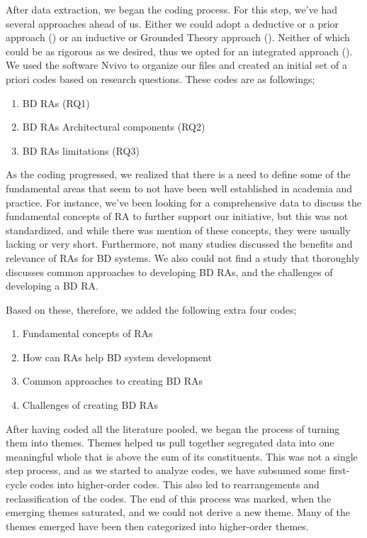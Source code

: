 \documentclass{ieeeaccess}
\begin{document}
After data extraction, we began the coding process. For this step, we've had several approaches ahead of us. Either we could adopt a deductive or a prior approach (\cite{miles1994qualitative}) or an inductive or Grounded Theory approach (\cite{corbin2014basics}). Neither of which could be as rigorous as we desired, thus we opted for an integrated approach (\cite{lofland1971analyzing}). We used the software Nvivo to organize our files and created an initial set of a priori codes based on research questions. These codes are as followings;

\begin{enumerate}
    \item BD RAs (RQ1)
    \item BD RAs Architectural components (RQ2)
    \item BD RAs limitations (RQ3)
\end{enumerate}

As the coding progressed, we realized that there is a need to define some of the fundamental areas that seem to not have been well established in academia and practice. For instance, we've been looking for a comprehensive data to discuss the fundamental concepts of RA to further support our initiative, but this was not standardized, and while there was mention of these concepts, they were usually lacking or very short. Furthermore, not many studies discussed the benefits and relevance of RAs for BD systems. We also could not find a study that thoroughly discusses common approaches to developing BD RAs, and the challenges of developing a BD RA.

Based on these, therefore, we added the following extra four codes;
\begin{enumerate}
    \item Fundamental concepts of RAs
    \item How can RAs help BD system development
    \item Common approaches to creating BD RAs
    \item Challenges of creating BD RAs
\end{enumerate}

After having coded all the literature pooled, we began the process of turning them into themes. Themes helped us pull together segregated data into one meaningful whole that is above the sum of its constituents. This was not a single step process, and as we started to analyze codes, we have subsumed some first-cycle codes into higher-order codes. This also led to rearrangements and reclassification of the codes. The end of this process was marked, when the emerging themes saturated, and we could not derive a new theme. Many of the themes emerged have been then categorized into higher-order themes. 
\end{document}

